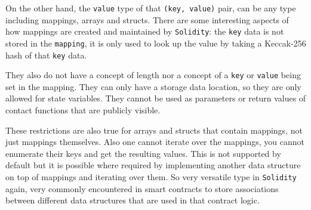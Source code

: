 On the other hand, the \texttt{value} type of that
\texttt{(key,\ value)} pair, can be any type including mappings, arrays
and structs. There are some interesting aspects of how mappings are
created and maintained by \texttt{Solidity}: the \texttt{key} data is
not stored in the \texttt{mapping}, it is only used to look up the value
by taking a Keccak-256 hash of that \texttt{key} data.

They also do not have a concept of length nor a concept of a
\texttt{key} or \texttt{value} being set in the mapping. They can only
have a storage data location, so they are only allowed for state
variables. They cannot be used as parameters or return values of contact
functions that are publicly visible.

These restrictions are also true for arrays and structs that contain
mappings, not just mappings themselves. Also one cannot iterate over the
mappings, you cannot enumerate their keys and get the resulting values.
This is not supported by default but it is possible where required by
implementing another data structure on top of mappings and iterating
over them. So very versatile type in \texttt{Solidity} again, very
commonly encountered in smart contracts to store associations between
different data structures that are used in that contract logic.
